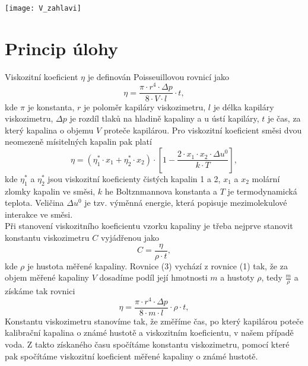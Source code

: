 \documentclass[12pt,a4paper]{article}
\begin{document}
\begin{center}
\texttt{[image: V\_zahlavi]}
\end{center}
\section*{Princip úlohy}
Viskozitní koeficient $\eta$ je definován Poisseuillovou rovnicí jako
\begin{equation}
	\eta = \dfrac{\pi\cdot r^4 \cdot \Delta p}{8\cdot V\cdot l}\cdot t,
\end{equation}
kde $\pi$ je konstanta, $r$ je poloměr kapiláry viskozimetru, $l$ je délka kapiláry viskozimetru, $\Delta p$ je rozdíl tlaků na hladině kapaliny a u ústí kapiláry, $t$ je čas, za který kapalina o objemu $V$ proteče kapilárou. Pro viskozitní koeficient směsi dvou neomezeně mísitelných kapalin pak platí
\begin{equation}
	\eta = (\eta_1^*\cdot x_1 + \eta_2^*\cdot x_2)\cdot \left[1-\dfrac{2\cdot x_1\cdot x_2 \cdot \Delta u^0}{k\cdot T}\right],
\end{equation}
kde $\eta_1^*$ a $\eta_2^*$ jsou viskozitní koeficienty čistých kapalin 1 a 2, $x_1$ a $x_2$ molární zlomky kapalin ve směsi, $k$ he Boltznmannova konstanta a $T$ je termodynamická teplota. Veličina $\Delta u^0$ je tzv. výměnná energie, která popisuje mezimolekulové interakce ve směsi.\\
Při stanovení viskozitního koeficientu vzorku kapaliny je třeba nejprve stanovit konstantu viskozimetru $C$ vyjádřenou jako
\begin{equation}
	C = \dfrac{\eta}{\rho \cdot t},
\end{equation}
kde $\rho$ je hustota měřené kapaliny. Rovnice (3) vychází z rovnice (1) tak, že za objem měřené kapaliny $V$ dosadíme podíl její hmotnosti $m$ a hustoty $\rho$, tedy  $\frac{m}{\rho}$ a získáme tak rovnici
\begin{equation}
	\eta = \dfrac{\pi\cdot r^4 \cdot \Delta p}{8\cdot m\cdot l}\cdot \rho \cdot t,
\end{equation} Konstantu viskozimetru stanovíme tak, že změříme čas, po který kapilárou poteče kalibrační kapalina o známé hustotě a viskozitním koeficientu, v našem případě voda. Z takto získaného času spočítáme konstantu viskozimetru, pomocí které pak spočítáme viskozitní koeficient měřené kapaliny o známé hustotě. 
\end{document}
